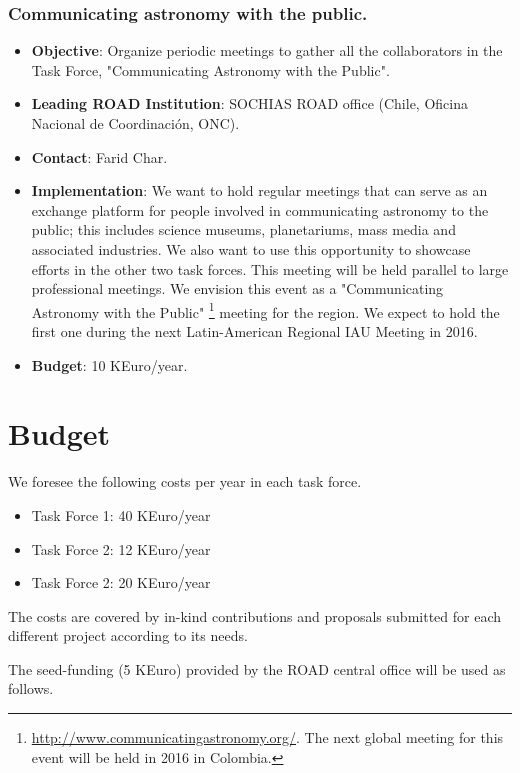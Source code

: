 \documentclass[12pt]{article}
\begin{document}
\subsubsection{Communicating astronomy with the
  public.}
\begin{itemize}
\item {\bf Objective}: Organize periodic meetings to gather all the
  collaborators in the Task Force, "Communicating Astronomy with the
  Public".  
\item {\bf Leading ROAD Institution}: SOCHIAS ROAD office
 (Chile, Oficina
  Nacional de Coordinaci\'on, ONC).
\item {\bf Contact}: Farid Char.
\item {\bf Implementation}: We want to hold regular meetings that can
  serve as an exchange platform for people involved in communicating
  astronomy to the public; this includes science museums,
  planetariums, mass media and associated industries. We also want to use
  this opportunity to showcase efforts in the other two task
  forces. This meeting will be held parallel to large professional
  meetings. We envision this event as a "Communicating Astronomy
  with the
  Public" \footnote{\url{http://www.communicatingastronomy.org/}. The
    next global meeting for this event will be held in 2016 in Colombia.}
  meeting for the region. We expect to hold the first one during the
  next Latin-American Regional IAU Meeting in 2016.  
\item {\bf Budget}: 10 KEuro/year.
\end{itemize}




\section{Budget}

We foresee the following costs per year in each task force. 
\begin{itemize}
\item Task Force 1: 40 KEuro/year
\item Task Force 2: 12 KEuro/year
\item Task Force 2: 20 KEuro/year
\end{itemize}

The costs are covered by in-kind contributions and proposals
submitted for each different project according to its needs.

The seed-funding (5 KEuro) provided by the ROAD central office will be used as follows.
\end{document}
